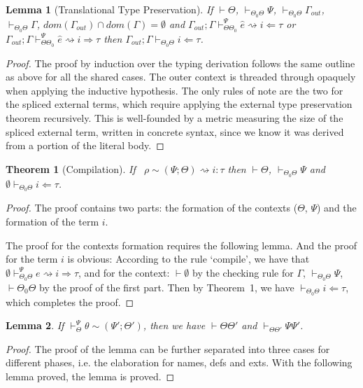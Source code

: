 \documentclass[letterpaper, notitlepage]{article}
\newtheorem{theorem}{Theorem}
\newtheorem{lemma}{Lemma}
\begin{document}
\begin{lemma}[Translational Type Preservation]
If $\vdash\Theta$, $\vdash_{\Theta_0\Theta} \Psi$, $\vdash_{\Theta_0\Theta}\Gamma_{out}$, $\vdash_{\Theta_0\Theta}\Gamma$, $dom(\Gamma_{out})\cap dom(\Gamma)=\emptyset$ and $\Gamma_{out};\Gamma\vdash_{\Theta\Theta_0}^{\Psi}\hat{e}\rightsquigarrow i\Leftarrow\tau$ or $\Gamma_{out};\Gamma\vdash_{\Theta\Theta_0}^{\Psi}\hat{e}\rightsquigarrow i\Rightarrow \tau$ then $\Gamma_{out};\Gamma\vdash_{\Theta_0\Theta}i\Leftarrow \tau$.
\end{lemma}
\begin{proof}
The proof by induction over the typing derivation follows the same outline as
above for all the shared cases. The outer context is threaded through opaquely when
applying the inductive hypothesis. The only rules of note are the two for the spliced external
terms, which require applying the external type preservation theorem recursively.
This is well-founded by a metric measuring the size of the spliced external term, written
in concrete syntax, since we know it was derived from a portion of the literal body.
\end{proof}

\begin{theorem}[Compilation]
If ~$\rho\sim(\Psi;\Theta)\rightsquigarrow i:\tau$ then $\vdash\Theta$, $\vdash_{\Theta_0\Theta}\Psi$ and $\emptyset\vdash_{\Theta_0\Theta} i\Leftarrow\tau$.
\end{theorem}
\begin{proof}
The proof contains two parts: the formation of the contexts ($\Theta$, $\Psi$) and the formation of the term $i$.

The proof for the contexts formation requires the following lemma. And the proof for the term $i$ is obvious: According to the rule `compile', we have that $\emptyset\vdash_{\Theta_0\Theta}^{\Psi}e\rightsquigarrow i\Rightarrow \tau$, and for the context: $\vdash\emptyset$ by the checking rule for $\Gamma$, $\vdash_{\Theta_0\Theta}\Psi$, $\vdash\Theta_0\Theta$ by the proof of the first part. Then by Theorem~1, we have $\vdash_{\Theta_0\Theta}i\Leftarrow\tau$, which completes the proof.
\end{proof}

\begin{lemma} If $\vdash_{\Theta}^{\Psi}\theta\sim(\Psi';\Theta')$, then we have $\vdash\Theta\Theta'$ and $\vdash_{\Theta\Theta'}\Psi\Psi'$.
\end{lemma}
\begin{proof}
The proof of the lemma can be further separated into three cases for different phases, i.e. the elaboration for names, defs and exts. With the following lemma proved, the lemma is proved.
\end{proof}
\end{document}
